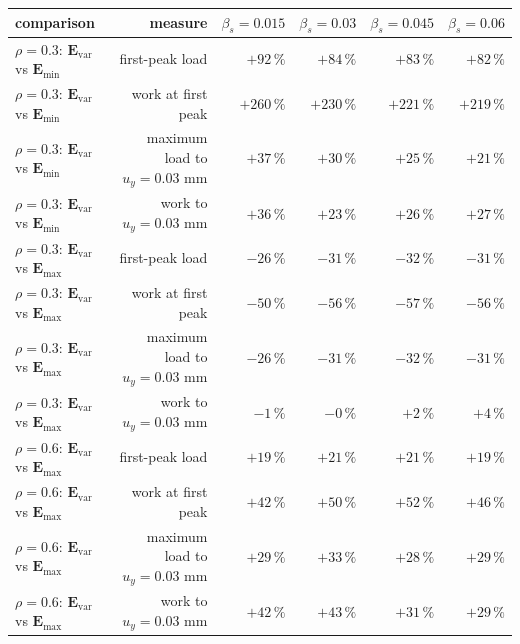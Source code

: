 \begin{tabular}{lrrrrr}
\toprule
comparison & measure & $\beta_s=0.015$ & $\beta_s=0.03$ & $\beta_s=0.045$ & $\beta_s=0.06$ \\
\midrule
$\rho=0.3$: $\mathbf{E}_{\mathrm{var}}$ vs $\mathbf{E}_{\mathrm{min}}$ & first-peak load & $+92\,\%$ & $+84\,\%$ & $+83\,\%$ & $+82\,\%$ \\
$\rho=0.3$: $\mathbf{E}_{\mathrm{var}}$ vs $\mathbf{E}_{\mathrm{min}}$ & work at first peak & $+260\,\%$ & $+230\,\%$ & $+221\,\%$ & $+219\,\%$ \\
$\rho=0.3$: $\mathbf{E}_{\mathrm{var}}$ vs $\mathbf{E}_{\mathrm{min}}$ & maximum load to $u_y=0.03$ mm & $+37\,\%$ & $+30\,\%$ & $+25\,\%$ & $+21\,\%$ \\
$\rho=0.3$: $\mathbf{E}_{\mathrm{var}}$ vs $\mathbf{E}_{\mathrm{min}}$ & work to $u_y=0.03$ mm & $+36\,\%$ & $+23\,\%$ & $+26\,\%$ & $+27\,\%$ \\
\addlinespace
$\rho=0.3$: $\mathbf{E}_{\mathrm{var}}$ vs $\mathbf{E}_{\mathrm{max}}$ & first-peak load & $-26\,\%$ & $-31\,\%$ & $-32\,\%$ & $-31\,\%$ \\
$\rho=0.3$: $\mathbf{E}_{\mathrm{var}}$ vs $\mathbf{E}_{\mathrm{max}}$ & work at first peak & $-50\,\%$ & $-56\,\%$ & $-57\,\%$ & $-56\,\%$ \\
$\rho=0.3$: $\mathbf{E}_{\mathrm{var}}$ vs $\mathbf{E}_{\mathrm{max}}$ & maximum load to $u_y=0.03$ mm & $-26\,\%$ & $-31\,\%$ & $-32\,\%$ & $-31\,\%$ \\
$\rho=0.3$: $\mathbf{E}_{\mathrm{var}}$ vs $\mathbf{E}_{\mathrm{max}}$ & work to $u_y=0.03$ mm & $-1\,\%$ & $-0\,\%$ & $+2\,\%$ & $+4\,\%$ \\
\addlinespace
$\rho=0.6$: $\mathbf{E}_{\mathrm{var}}$ vs $\mathbf{E}_{\mathrm{max}}$ & first-peak load & $+19\,\%$ & $+21\,\%$ & $+21\,\%$ & $+19\,\%$ \\
$\rho=0.6$: $\mathbf{E}_{\mathrm{var}}$ vs $\mathbf{E}_{\mathrm{max}}$ & work at first peak & $+42\,\%$ & $+50\,\%$ & $+52\,\%$ & $+46\,\%$ \\
$\rho=0.6$: $\mathbf{E}_{\mathrm{var}}$ vs $\mathbf{E}_{\mathrm{max}}$ & maximum load to $u_y=0.03$ mm & $+29\,\%$ & $+33\,\%$ & $+28\,\%$ & $+29\,\%$ \\
$\rho=0.6$: $\mathbf{E}_{\mathrm{var}}$ vs $\mathbf{E}_{\mathrm{max}}$ & work to $u_y=0.03$ mm & $+42\,\%$ & $+43\,\%$ & $+31\,\%$ & $+29\,\%$ \\
\bottomrule
\end{tabular}
